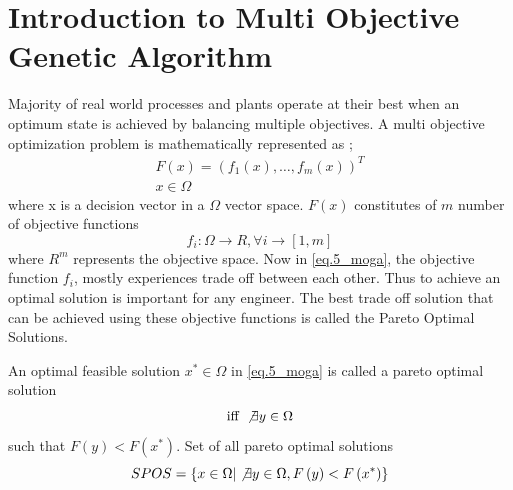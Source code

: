\section{Introduction to Multi Objective Genetic Algorithm}
Majority of real world processes and plants operate at their best when an optimum state is achieved by balancing multiple objectives. A multi objective optimization problem is mathematically represented as \cite{OReilly2012,Whitley1994};
\[\begin{array}{l} \label{eq.5_moga}
F\left( x \right) = {\left( {{f_1}(x), \ldots ,{f_m}(x)} \right)^T}\\
x \in \Omega \nonumber
\end{array}\]
where x is a decision vector in a $ \Omega $ vector space. $ F\left( x \right) $ constitutes of $ m $ number of objective functions \[{f_i}:\Omega  \to R,\forall i \to \left[ {1,m} \right]\] 
where $ R^m $ represents the objective space. Now in \eqref{eq.5_moga}, the objective function $ f_i $, mostly experiences trade off between each other. Thus to achieve an optimal solution is important for any engineer. The best trade off solution that can be achieved using these objective functions is called the Pareto Optimal Solutions. 
\begin{Definition}\label{def:5_1} 
	An optimal feasible solution $ {x^*} \in \Omega $ in \eqref{eq.5_moga} is called a pareto optimal solution \[\text{iff }\not \exists y \in \Omega \] such that $ F\left( y \right) < F\left( {{x^*}} \right) $. Set of all pareto optimal solutions
	\[SPOS = \left\{ {x \in \Omega |\not \exists y \in \Omega ,F\left( y \right) < F\left( {{x^*}} \right)} \right\}\]	
\end{Definition} 

